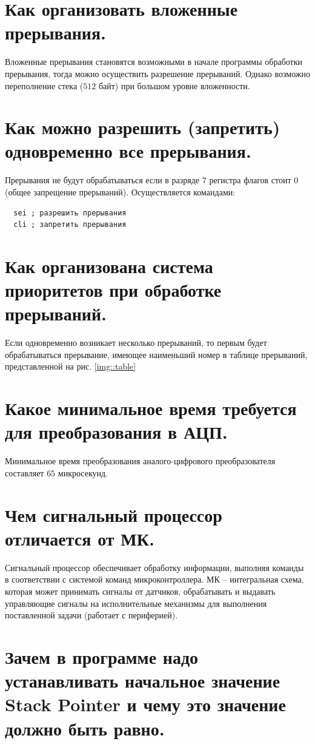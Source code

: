 \section{Как организовать вложенные прерывания.}
Вложенные прерывания становятся возможными в начале программы обработки
прерывания, тогда можно осуществить разрешение прерываний. Однако 
возможно переполнение стека ($512$ байт) при большом уровне вложенности.


\section{Как можно разрешить (запретить) одновременно все прерывания.}
Прерывания не будут обрабатываться если в разряде $7$ регистра флагов 
стоит $0$ (общее запрещение прерываний). Осуществляется командами:
\begin{verbatim}
  sei ; разрешить прерывания
  cli ; запретить прерывания
\end{verbatim}

\section{Как организована система приоритетов при обработке прерываний. }
Если одновременно возникает несколько прерываний, то первым будет 
обрабатываться прерывание, имеющее наименьший номер в таблице прерываний, представленной на рис. \ref{img::table}

\section{Какое минимальное время требуется для преобразования в АЦП.}
Минимальное время преобразования аналого-цифрового преобразователя 
составляет $65$ микросекунд.

\section{Чем сигнальный процессор отличается от МК.}

Сигнальный процессор обеспечивает обработку информации, выполняя команды в соответствии с 
системой команд микроконтроллера. 
МК – интегральная схема, которая может принимать сигналы от датчиков, обрабатывать и 
выдавать управляющие сигналы на исполнительные механизмы для выполнения поставленной задачи 
(работает с периферией).

\section{Зачем в программе надо устанавливать начальное значение Stack Pointer и чему это значение должно быть равно.}

